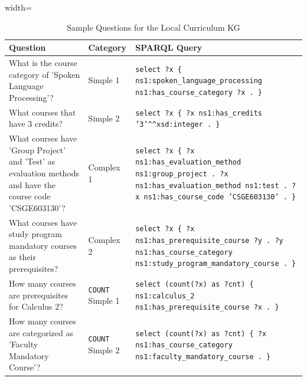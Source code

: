 \begin{table}
\centering
\renewcommand{\arraystretch}{1.15}
\setlength{\tabcolsep}{12pt}
\begin{adjustbox}{width=\textwidth}
    \begin{tabular}{| m{} | m{} |  m{} |}
    \hline
    \textbf{Question} & \textbf{Category} & \textbf{SPARQL Query}\\
    \hline
    What is the course category of 'Spoken Language Processing'? & Simple 1 & \texttt{select ?x \{ ns1:spoken\_language\_processing ns1:has\_course\_category ?x . \}} \\
    \hline
    What courses that have 3 credits? & Simple 2 & \texttt{select ?x \{ ?x ns1:has\_credits '3'\textasciicircum\textasciicircum xsd:integer . \}} \\
    \hline
    What courses have 'Group Project' and 'Test' as evaluation methods and have the course code 'CSGE603130'? & Complex 1 & \texttt{select ?x \{ ?x ns1:has\_evaluation\_method ns1:group\_project . ?x ns1:has\_evaluation\_method ns1:test . ?x ns1:has\_course\_code 'CSGE603130' . \}} \\
    \hline
    What courses have study program mandatory courses as their prerequisites? & Complex 2 & \texttt{select ?x \{ ?x ns1:has\_prerequisite\_course ?y . ?y ns1:has\_course\_category ns1:study\_program\_mandatory\_course . \}} \\
    \hline
    How many courses are prerequisites for Calculus 2? & \texttt{COUNT} Simple 1 & \texttt{select (count(?x) as ?cnt) \{ ns1:calculus\_2 ns1:has\_prerequisite\_course ?x . \}} \\
    \hline
    How many courses are categorized as 'Faculty Mandatory Course'? & \texttt{COUNT} Simple 2 & \texttt{select (count(?x) as ?cnt) \{ ?x ns1:has\_course\_category ns1:faculty\_mandatory\_course . \}} \\
    \hline
    \end{tabular}
\end{adjustbox}
\vspace{1em}
\caption{Sample Questions for the Local Curriculum KG}
\label{table-questions-local}
\end{table}

